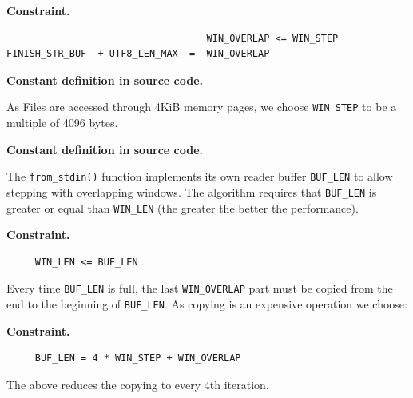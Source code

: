 \textbf{Constraint.}

\begin{verbatim}
                                   WIN_OVERLAP <= WIN_STEP
FINISH_STR_BUF  + UTF8_LEN_MAX  =  WIN_OVERLAP
\end{verbatim}

\textbf{Constant definition in source code.}

\begin{Shaded}
\begin{Highlighting}[]
       \NormalTok{;}
\end{Highlighting}
\end{Shaded}

As Files are accessed through 4KiB memory pages, we choose
\texttt{WIN\_STEP} to be a multiple of 4096 bytes.

\textbf{Constant definition in source code.}

\begin{Shaded}
\begin{Highlighting}[]
      \NormalTok{= }\NormalTok{; }
\end{Highlighting}
\end{Shaded}

The \texttt{from\_stdin()} function implements its own reader buffer
\texttt{BUF\_LEN} to allow stepping with overlapping windows. The
algorithm requires that \texttt{BUF\_LEN} is greater or equal than
\texttt{WIN\_LEN} (the greater the better the performance).

\textbf{Constraint.}

\begin{verbatim}
     WIN_LEN <= BUF_LEN
\end{verbatim}

Every time \texttt{BUF\_LEN} is full, the last \texttt{WIN\_OVERLAP}
part must be copied from the end to the beginning of \texttt{BUF\_LEN}.
As copying is an expensive operation we choose:

\textbf{Constraint.}

\begin{verbatim}
     BUF_LEN = 4 * WIN_STEP + WIN_OVERLAP
\end{verbatim}

The above reduces the copying to every 4th iteration.

